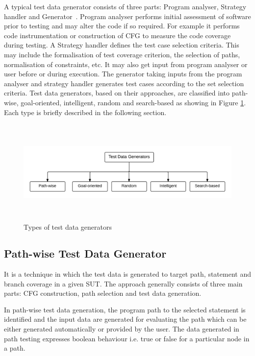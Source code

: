 A typical test data generator consists of three parts: Program analyser, Strategy handler and Generator~\cite{edvardsson1999survey}. Program analyser performs initial assessment of software prior to testing and may alter the code if so required. For example it performs code instrumentation or construction of CFG to measure the code coverage during testing. A Strategy handler defines the test case selection criteria. This may include the formalisation of test coverage criterion, the selection of paths, normalisation of constraints, etc. It may also get input from program analyser or user before or during execution. The generator taking inputs from the program analyser and strategy handler generates test cases according to the set selection criteria. Test data generators, based on their approaches, are classified into path-wise, goal-oriented, intelligent, random and search-based as showing in Figure \ref{testDataGenerators_2}. Each type is briefly described in the following section.
\begin{figure}[h]
	\centering
	\centerline{\includegraphics[width=16.5cm, height=5.2cm ]{chapter2/testDataGenerators.png}}
	\caption{Types of test data generators}
	\label{testDataGenerators_2}
\end{figure}

\subsection{Path-wise Test Data Generator} 
\label{sec:pathwise_2}
It is a technique in which the test data is generated to target path, statement and branch coverage in a given SUT. The approach generally consists of three main parts: CFG construction, path selection and test data generation. 

In path-wise test data generation, the program path to the selected statement is identified and the input data are generated for evaluating the path which can be either generated automatically or provided by the user. The data generated in path testing expresses boolean behaviour i.e. true or false for a particular node in a path. 

